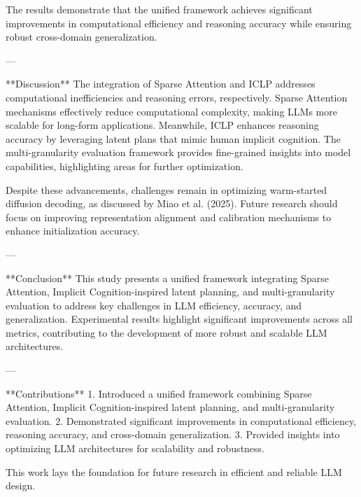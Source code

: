 The results demonstrate that the unified framework achieves significant improvements in computational efficiency and reasoning accuracy while ensuring robust cross-domain generalization.  

---

**Discussion**  
The integration of Sparse Attention and ICLP addresses computational inefficiencies and reasoning errors, respectively. Sparse Attention mechanisms effectively reduce computational complexity, making LLMs more scalable for long-form applications. Meanwhile, ICLP enhances reasoning accuracy by leveraging latent plans that mimic human implicit cognition. The multi-granularity evaluation framework provides fine-grained insights into model capabilities, highlighting areas for further optimization.  

Despite these advancements, challenges remain in optimizing warm-started diffusion decoding, as discussed by Miao et al. (2025). Future research should focus on improving representation alignment and calibration mechanisms to enhance initialization accuracy.  

---

**Conclusion**  
This study presents a unified framework integrating Sparse Attention, Implicit Cognition-inspired latent planning, and multi-granularity evaluation to address key challenges in LLM efficiency, accuracy, and generalization. Experimental results highlight significant improvements across all metrics, contributing to the development of more robust and scalable LLM architectures.  

---

**Contributions**  
1. Introduced a unified framework combining Sparse Attention, Implicit Cognition-inspired latent planning, and multi-granularity evaluation.  
2. Demonstrated significant improvements in computational efficiency, reasoning accuracy, and cross-domain generalization.  
3. Provided insights into optimizing LLM architectures for scalability and robustness.  

This work lays the foundation for future research in efficient and reliable LLM design.